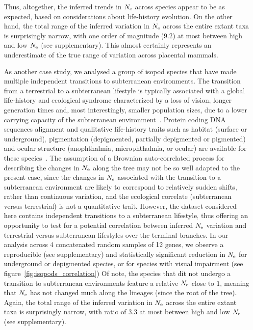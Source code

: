 \documentclass{MBE}
\begin{document}
	Thus, altogether, the inferred trends in $N_{\text{e}}$ across species appear to be as expected, based on considerations about life-history evolution.
	On the other hand, the total range of the inferred variation in $N_{\text{e}}$ across the entire extant taxa is surprisingly narrow, with one order of magnitude ($9.2$) at most between high and low $N_{\text{e}}$ (see supplementary).
	This almost certainly represents an underestimate of the true range of variation across placental mammals.

	As another case study, we analysed a group of isopod species that have made multiple independent transitions to subterranean environments.
	The transition from a terrestrial to a subterranean lifestyle is typically associated with a global life-history and ecological syndrome characterized by a loss of vision, longer generation times and, most interestingly, smaller population sizes, due to a lower carrying capacity of the subterranean environment~\citep{Capderrey2013}.
	Protein coding {DNA} sequences alignment and qualitative life-history traits such as habitat (surface or underground), pigmentation (depigmented, partially depigmented or pigmented) and ocular structure (anophthalmia, microphthalmia, or ocular) are available for these species~\citep{Eme2013,Saclier2018}.
	The assumption of a Brownian auto-correlated process for describing the changes in $N_{\text{e}}$ along the tree may not be so well adapted to the present case, since the changes in $N_{\text{e}}$ associated with the transition to a subterranean environment are likely to correspond to relatively sudden shifts, rather than continuous variation, and the ecological correlate (subterranean versus terrestrial) is not a quantitative trait.
	However, the dataset considered here contains independent transitions to a subterranean lifestyle, thus offering an opportunity to test for a potential correlation between inferred $N_{\text{e}}$ variation and terrestrial versus subterranean lifestyles over the terminal branches.
	In our analysis across 4 concatenated random samples of 12 genes, we observe a reproducible (see supplementary) and statistically significant reduction in $N_{\text{e}}$ for underground or depigmented species, or for species with visual impairment (see figure~\ref{fig:isopods_correlation})
	Of note, the species that dit not undergo a transition to subterranean environments feature a relative $N_{\text{e}}$ close to $1$, meaning that $N_{\text{e}}$ has not changed much along the lineages (since the root of the tree).
	Again, the total range of the inferred variation in $N_{\text{e}}$ across the entire extant taxa is surprisingly narrow, with ratio of $3.3$ at most between high and low $N_{\text{e}}$ (see supplementary).
\end{document}
